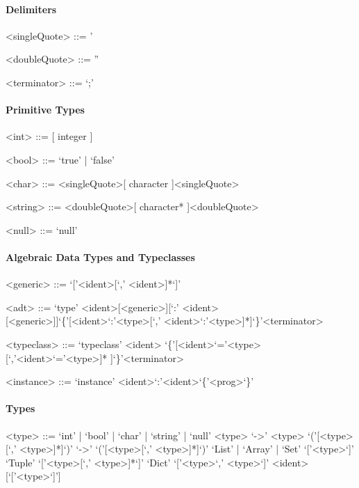 \documentclass[11pt]{article} %
\begin{document}
\paragraph{Delimiters}

\begin{grammar}

<singleQuote> ::= '

<doubleQuote> ::= ''

<terminator> ::= `;'

\end{grammar}

\paragraph{Primitive Types}

\begin{grammar}

<int> ::= [ integer ]

<bool> ::= `true' | `false'

<char> ::= <singleQuote>[ character ]<singleQuote>

<string> ::= <doubleQuote>[ character* ]<doubleQuote>

<null> ::= `null'

\end{grammar}

\paragraph{Algebraic Data Types and Typeclasses}

\begin{grammar}

<generic> ::= `['<ident>[`,' <ident>]*`]'

<adt> ::= `type' <ident>[<generic>][`:' <ident>[<generic>]]`\{'[<ident>`:'<type>[`,' <ident>`:'<type>]*]`\}'<terminator>
 
<typeclass> ::= `typeclass' <ident> `\{'[<ident>`='<type>[`,'<ident>`='<type>]* ]`\}'<terminator>

<instance> ::= `instance' <ident>`:'<ident>`\{'<prog>`\}'

\end{grammar}

\paragraph{Types}

\begin{grammar}

<type> ::= `int' | `bool' | `char' | `string' | `null'
\alt <type> `->' <type>
\alt `('[<type>[`,' <type>]*]`)' `->' `('[<type>[`,' <type>]*]`)'
\alt `List' | `Array' | `Set' `['<type>`]'
\alt `Tuple' `['<type>[`,' <type>]*`]'
\alt `Dict' `['<type>`,' <type>`]'
\alt <ident>[`['<type>`]']

\end{grammar}
\end{document}
